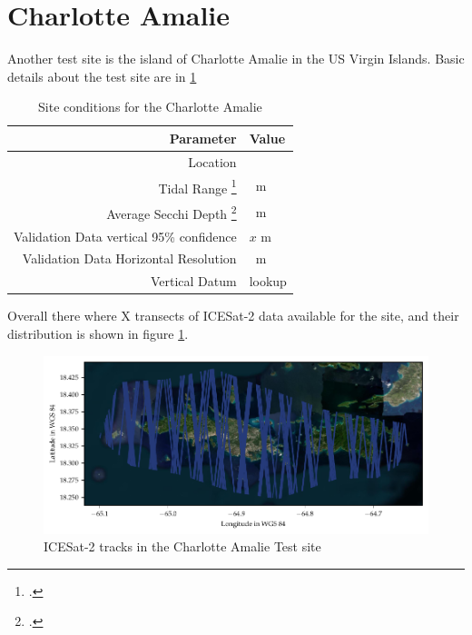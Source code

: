 \section{Charlotte Amalie}
Another test site is the island of Charlotte Amalie in the US Virgin Islands. Basic details about the test site are in \ref{table:charlotteamalie_datatable}
\begin{table}[h]
    \begin{minipage}{0.5\textwidth}
        \centering\begin{tabular}{r l }
            Parameter                                                 & \textbf{Value} \\
            \hline
            Location                                                  &                \\
            Tidal Range \footcite{Tidal_data_reanalysis2022}          & \qty{}{m}      \\
            Average Secchi Depth \footcite{ACRI-STGlobColourTeam2020} & \qty{}{m}      \\
            Validation Data vertical 95\% confidence                  & $x$ m          \\
            Validation Data Horizontal Resolution                     & \qty{}{m}      \\
            Vertical Datum                                            & lookup         \\
        \end{tabular}
    \end{minipage}
    \caption{Site conditions for the Charlotte Amalie}
    \label{table:charlotteamalie_datatable}
\end{table}
Overall there where X  transects of ICESat-2 data available for the site, and their distribution is shown in figure \ref{fig:charlotteamalietracklines}.

\begin{figure}[h]
    \centering
    \includegraphics[width=\textwidth]{figures/Charlotteamalie_tracklines.pdf}
    \caption{ICESat-2 tracks in the Charlotte Amalie Test site}
    \label{fig:charlotteamalietracklines}
\end{figure}

